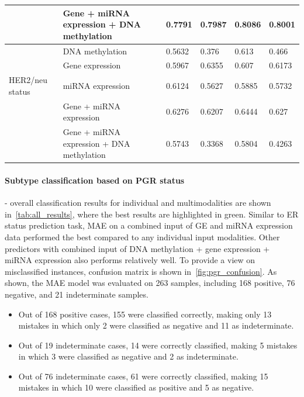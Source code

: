\begin{table}[h]
\begin{tabular}{l|l|l|l|l|l}
        \cline{2-6}
                     & Gene + miRNA expression + DNA methylation & 0.7791 & 0.7987    & 0.8086 & 0.8001  \\ 
        \hline
                    & DNA methylation   & 0.5632 & 0.376     & 0.613  & 0.466   \\ 
        \cline{2-6}
                     & Gene expression   & 0.5967 & 0.6355    & 0.607  & 0.6173  \\ 
        \cline{2-6}
        HER2/neu status & miRNA expression  & 0.6124 & 0.5627    & 0.5885 & 0.5732  \\ 
        \cline{2-6}
                   & Gene + miRNA expression   & 0.6276 & 0.6207    & 0.6444 & 0.627   \\ 
        \cline{2-6}
                   & Gene + miRNA expression + DNA methylation & 0.5743 & 0.3368    & 0.5804 & 0.4263  \\
        \hline
    \end{tabular}
    \vspace{-2mm}
\end{table}

\paragraph{Subtype classification based on PGR status} - overall classification results for individual and multimodalities are shown in~\cref{tab:all_results}, where the best results are highlighted in green. Similar to ER status prediction task, MAE on a combined input of GE and miRNA expression data performed the best compared to any individual input modalities. Other predictors with combined input of DNA methylation + gene expression + miRNA expression also performs relatively well. To provide a view on misclassified instances, confusion matrix is shown in~\cref{fig:pgr_confusion}. As shown, the MAE model was evaluated on 263 samples, including 168 positive, 76 negative, and 21 indeterminate samples. 

\begin{itemize}[noitemsep]
    \item Out of 168 positive cases, 155 were classified correctly, making only 13 mistakes in which only 2 were classified as negative and 11 as indeterminate. 
    \item Out of 19 indeterminate cases, 14 were correctly classified, making 5 mistakes in which 3 were classified as negative and 2 as indeterminate. 
    \item Out of 76 indeterminate cases, 61 were correctly classified, making 15 mistakes in which 10 were classified as positive and 5 as negative.  
\end{itemize}

